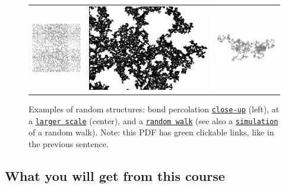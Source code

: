 \documentclass[oneside,11pt]{amsart}
\begin{document}
\begin{figure}[h]
	\begin{tabular}{ccc}
		\includegraphics[height=.32\textwidth]{img/Bond_percolation_p_51.png}
		&\hspace{10pt}\includegraphics[height=.32\textwidth]{img/Amas_de_percolation_gray.png}
		&\includegraphics[angle=90,height=.32\textwidth]{img/RW1.png}
	\end{tabular}
	\def\figurename{}
	\caption{Examples of random structures: bond percolation
	\href{https://en.wikipedia.org/wiki/Percolation_theory}{\texttt{close-up}}
	(left),
	at a \href{https://commons.wikimedia.org/wiki/File:Amas_de_percolation.png}{\texttt{larger scale}} (center),
	and
	a 
	\href{https://en.wikipedia.org/wiki/Random_walk\#Lattice_random_walk}{\texttt{random walk}}
	(see also a
	\href{https://upload.wikimedia.org/wikipedia/commons/f/f3/Random_walk_2500_animated.svg}{\texttt{simulation}} 
	of a random walk).
	\tiny{Note:
	this PDF has green clickable links, like in the previous sentence.}
	}
\end{figure}

\subsection*{What you will get from this course}
\end{document}
